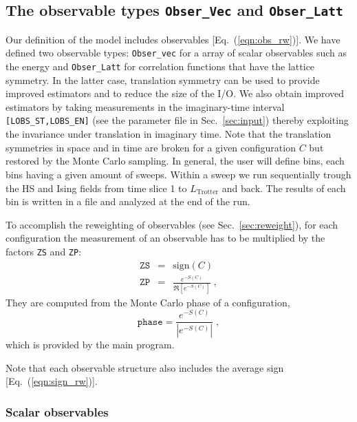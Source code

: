 \subsection{The observable types \texttt{Obser\_Vec} and \texttt{Obser\_Latt}}\label{sec:obs}

Our definition  of the model includes observables [Eq.~(\ref{eqn:obs_rw})]. We have defined two observable types: \texttt{Obser\_vec}  for a array of scalar observables
such as the energy and  \texttt{Obser\_Latt}   for correlation functions that have the lattice symmetry. In the latter case, translation symmetry can be used to provide improved estimators and to reduce the size of the I/O.   
We also obtain improved estimators by taking measurements in the imaginary-time interval \texttt{[LOBS\_ST,LOBS\_EN]}  (see the parameter file in Sec.~\ref{sec:input}) thereby exploiting the invariance under translation in imaginary time.
Note that the translation symmetries  in space and in time are broken for a given  configuration $C$ but restored by the Monte Carlo sampling. 
In general, the user will define bins, each bins having a given amount of sweeps. Within a sweep we run sequentially trough the HS and Ising fields from   time slice 1 to $L_{\text{Trotter}}$ and back.  The results of each bin is written  in a file  and analyzed at the end of the run.     

To accomplish the reweighting of observables (see Sec.~\ref{sec:reweight}), for each configuration the measurement of an observable has to be multiplied by the factors \texttt{ZS} and \texttt{ZP}:
\begin{eqnarray}
\texttt{ZS} &=& \text{sign}(C)\;\\
\texttt{ZP} &=& \frac{e^{-S(C)}} {\Re \left[e^{-S(C)} \right]}\;,
\end{eqnarray}
They are computed from the Monte Carlo phase of a configuration,
\begin{equation}\label{eqn:phase}
	\texttt{phase}   =   \frac{e^{-S(C)}}{ \left| e^{-S(C) }\right| }\;,
\end{equation}
which is provided by the main program.


Note that each observable structure also includes the average sign [Eq.~(\ref{eqn:sign_rw})].

\subsubsection{Scalar observables}

